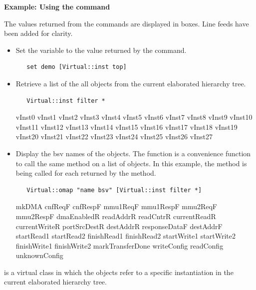 {\bf Example: Using the  command}

The values returned from the commands are displayed in boxes.  Line
feeds have been added for clarity.


\begin{itemize}

\item   Set the
variable  to the value returned by the  command.
\begin{verbatim}
   set demo [Virtual::inst top]
\end{verbatim}

\item Retrieve a list of the all  objects from the
current elaborated hierarchy tree.
\begin{verbatim}
   Virtual::inst filter *
\end{verbatim}

\begin{codebox}
vInst0 vInst1 vInst2 vInst3 vInst4 vInst5 vInst6 vInst7 vInst8 vInst9
vInst10 vInst11 vInst12 vInst13 vInst14 vInst15 vInst16 vInst17
vInst18 vInst19 vInst20 vInst21 vInst22 vInst23 vInst24 vInst25
vInst26 vInst27 
\end{codebox}

\item  Display the bsv names of the  objects. The
  function is a convenience function to 
call the same method on a list of objects.  In this example, the
 method  is being called for each  returned by
 the  method.
\begin{verbatim}
   Virtual::omap "name bsv" [Virtual::inst filter *]
\end{verbatim}

\begin{codebox}
mkDMA cnfReqF cnfRespF mmu1ReqF mmu1RespF mmu2ReqF mmu2RespF
dmaEnabledR readAddrR readCntrR currentReadR currentWriteR
portSrcDestR destAddrR responseDataF destAddrF startRead1 startRead2
finishRead1 finishRead2 startWrite1 startWrite2 finishWrite1
finishWrite2 markTransferDone writeConfig readConfig unknownConfig 
\end{codebox}

\end{itemize}



 is a virtual class in which  the 
 objects refer to  a specific instantiation in the
current elaborated hierarchy tree.

